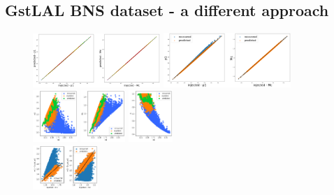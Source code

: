 \documentclass[prd,aps,twocolumn,a4paper,showkeys,nofootinbib]{revtex4-1}
\begin{document}
\subsection{GstLAL BNS dataset - a different approach}
\label{sec:GstLAL2}
%
\begin{figure}[]
  \center
  \includegraphics[width=0.43\textwidth]{./Figs/GstLAL_p_regression.png}
  \includegraphics[width=0.43\textwidth]{./Figs/GstLAL_p_regression_noise.png}\\
  \includegraphics[width=0.15\textwidth]{./Figs/GstLAL_p_m2.png}
  \includegraphics[width=0.15\textwidth]{./Figs/GstLAL_p_Mc.png}
  \includegraphics[width=0.15\textwidth]{./Figs/GstLAL_p_q.png}\\
  \includegraphics[width=0.22\textwidth]{./Figs/GstLAL_p_m1m2.png}

\end{figure}
\end{document}
